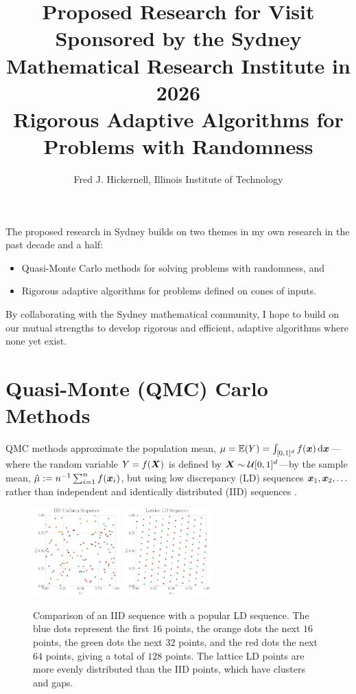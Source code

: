 \documentclass{amsart}
\begin{document}
\title{Proposed Research for Visit Sponsored by the 
Sydney Mathematical Research Institute in 2026 \\
\bigskip 
\large{Rigorous Adaptive Algorithms for Problems with Randomness}}
\author{Fred J. Hickernell, Illinois Institute of Technology}

\maketitle

The proposed research in Sydney builds on two themes in my own research in the past decade and a half:
\begin{itemize}
    \item Quasi-Monte Carlo methods for solving problems with randomness, and
    \item Rigorous adaptive algorithms for problems defined on cones of inputs.
\end{itemize}
By collaborating with the Sydney mathematical community, I hope to build on our mutual strengths to develop rigorous and efficient, adaptive algorithms where none yet exist.

\section{Quasi-Monte (QMC) Carlo Methods }
QMC methods approximate the population mean, $\mu=\operatorname{\mathbb{E}}(Y) = \int_{[0,1]^d} f(\boldsymbol{x}) \, {\rm d} \boldsymbol{x}$---where the random variable $Y = f(\boldsymbol{X})$ is defined by $\boldsymbol{X} \sim \mathcal{U}[0,1]^d$---by the sample mean, $\hat{\mu} := n^{-1} \sum_{i=1}^n f(\boldsymbol{x}_i)$, but using low discrepancy (LD) sequences $\boldsymbol{x}_1, \boldsymbol{x}_2, \ldots$ rather than independent and identically distributed (IID) sequences \cite{DicEtal22a,DicEtal14a,DicPil10a}.

\begin{figure}[h]
\centering
\includegraphics[width = 0.3\textwidth]{Figures/Uniform.pdf} \qquad 
\includegraphics[width = 0.3\textwidth]{Figures/Lattice.pdf}
    \caption{Comparison of an IID sequence with a popular LD sequence.  The blue dots represent the first $16$ points, the orange dots the next $16$ points, the green dots the next $32$ points, and the red dots the next $64$ points, giving a total of $128$ points.  The lattice LD points are more evenly distributed than the IID points, which have clusters and gaps. \label{fig:points}}
\end{figure}
\end{document}
